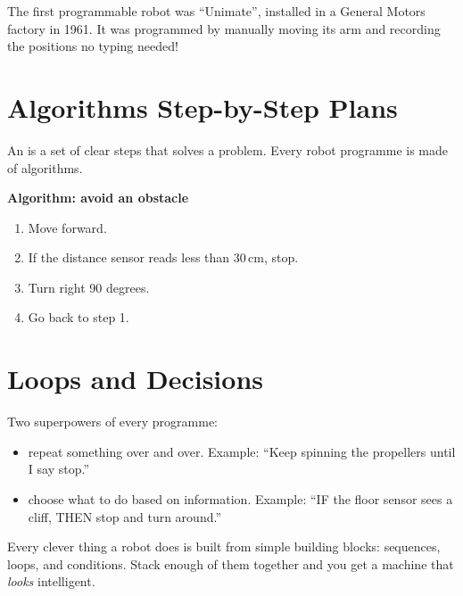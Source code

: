 \begin{funfact}
  The first programmable robot was ``Unimate'', installed in a General Motors
  factory in 1961. It was programmed by manually moving its arm and recording
  the positions \textemdash{} no typing needed!
\end{funfact}

\sectionrule

\section*{Algorithms \textemdash{} Step-by-Step Plans}

An  is a set of clear steps that solves a problem.
Every robot programme is made of algorithms.

\begin{quickmap}
  \textbf{Algorithm: avoid an obstacle}
  \begin{enumerate}
    \item Move forward.
    \item If the distance sensor reads less than 30\,cm, stop.
    \item Turn right 90 degrees.
    \item Go back to step 1.
  \end{enumerate}
\end{quickmap}

\sectionrule

\section*{Loops and Decisions}

Two superpowers of every programme:

\begin{itemize}
  \item \textbf{} \textemdash{} repeat something over and over.
    Example: ``Keep spinning the propellers until I say stop.''
  \item \textbf{} \textemdash{} choose what to do based on information.
    Example: ``IF the floor sensor sees a cliff, THEN stop and turn around.''
\end{itemize}

\begin{bigidea}
  Every clever thing a robot does is built from simple building blocks:
  sequences, loops, and conditions. Stack enough of them together
  and you get a machine that \emph{looks} intelligent.
\end{bigidea}

